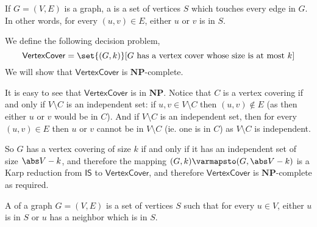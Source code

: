 \documentclass[10pt]{article}
\def\is{\mathsf{IS}}
\def\NP{\mathbf{NP}}
\begin{document}
\begin{defn*}

    If $G=(V,E)$ is a graph, a  is a set of vertices $S$ which touches every edge in $G$.
    In other words, for every $(u,v)\in E$, either $u$ or $v$ is in $S$.

\end{defn*}

\def\vertcover{\mathsf{VertexCover}}
\begin{exam*}

    We define the following decision problem,
    \[ \vertcover = \set{(G,k)}[\text{$G$ has a vertex cover whose size is at most $k$}] \]
    We will show that $\vertcover$ is $\NP$-complete.

    It is easy to see that $\vertcover$ is in $\NP$.
    Notice that $C$ is a vertex covering if and only if $V\setminus C$ is an independent set: if $u,v\in V\setminus C$ then $(u,v)\notin E$ (as then either $u$ or $v$ would be in $C$).
    And if $V\setminus C$ is an independent set, then for every $(u,v)\in E$ then $u$ or $v$ cannot be in $V\setminus C$ (ie. one is in $C$) as $V\setminus C$ is independent.

    So $G$ has a vertex covering of size $k$ if and only if it has an independent set of size $\abs V-k$, and therefore the mapping $(G,k)\varmapsto(G,\abs V-k)$ is a Karp reduction from $\is$ to
    $\vertcover$, and therefore $\vertcover$ is $\NP$-complete as required.

\end{exam*}

\begin{defn*}

    A  of a graph $G=(V,E)$ is a set of vertices $S$ such that for every $u\in V$, either $u$ is in $S$ or $u$ has a neighbor which is in $S$.

\end{defn*}
\end{document}
